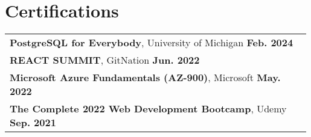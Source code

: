 \documentclass[letterpaper,11pt]{article}
\begin{document}
\section{Certifications}
\begin{tabular}{p{0.99\linewidth}}
    \hspace{0.15in}\textbf{PostgreSQL for Everybody}, University of Michigan
        \hfill \textbf{Feb. 2024} \\
    \hspace{0.15in}\textbf{REACT SUMMIT}, GitNation
        \hfill \textbf{Jun. 2022} \\
    \hspace{0.15in}\textbf{Microsoft Azure Fundamentals (AZ-900)}, Microsoft
        \hfill \textbf{May. 2022} \\
    \hspace{0.15in}\textbf{The Complete 2022 Web Development Bootcamp}, Udemy
        \hfill \textbf{Sep. 2021} \\
\end{tabular}
\end{document}
